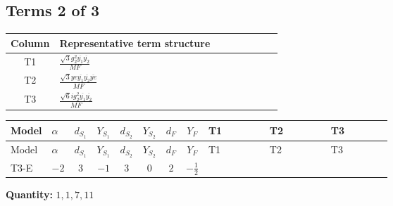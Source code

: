 \documentclass[8pt]{article}
\begin{document}
\begin{landscape}
\subsection*{Terms 2 of 3}
\begin{center}
\begin{tabular}{@{}c >{\raggedright\arraybackslash}p{0.82\linewidth}@{}}
\toprule
Column & Representative term structure \\
\midrule
T1 & \(\displaystyle \frac{\sqrt{3} g_{2}^{2} \overline{y_{1}} \overline{y_{2}}}{MF}\) \\
\midrule
T2 & \(\displaystyle \frac{\sqrt{3} ye \overline{y_{1}} \overline{y_{2}} \overline{ye}}{MF}\) \\
\midrule
T3 & \(\displaystyle \frac{\sqrt{6} i g_{2}^{2} \overline{y_{1}} \overline{y_{2}}}{MF}\) \\
\midrule
\bottomrule
\end{tabular}
\end{center}
\smallskip
\tiny
\begin{longtable}{@{}llcccccc >{\raggedright\arraybackslash}p{0.21\linewidth} >{\raggedright\arraybackslash}p{0.21\linewidth} >{\raggedright\arraybackslash}p{0.21\linewidth}@{}}
\toprule
Model & $\alpha$ & $d_{S_1}$ & $Y_{S_1}$ & $d_{S_2}$ & $Y_{S_2}$ & $d_F$ & $Y_F$ & T1 & T2 & T3 \\
\midrule
\endfirsthead
\toprule
Model & $\alpha$ & $d_{S_1}$ & $Y_{S_1}$ & $d_{S_2}$ & $Y_{S_2}$ & $d_F$ & $Y_F$ & T1 & T2 & T3 \\
\midrule
\endhead
T3-E & $-2$ & $3$ & $-1$ & $3$ & $0$ & $2$ & $-\frac{1}{2}$ & \scriptsize\adjustbox{max width=\linewidth}{$\begin{gathered} \frac{49 \sqrt{3} g_{2}^{2} \overline{y_{1}} \overline{y_{2}}}{24 MF}\end{gathered}$} & \scriptsize\adjustbox{max width=\linewidth}{$\begin{gathered} - \frac{\sqrt{3} ye \overline{y_{1}} \overline{y_{2}} \overline{ye}}{12 MF}\end{gathered}$} & \scriptsize\adjustbox{max width=\linewidth}{$\begin{gathered} \frac{\sqrt{6} i g_{2}^{2} \overline{y_{1}} \overline{y_{2}}}{3 MF}\end{gathered}$} \\
\midrule
\bottomrule
\end{longtable}
\clearpage
\noindent\textbf{Quantity: }$\mathrm{1,1,7,11}$\par\smallskip

\end{landscape}
\end{document}
